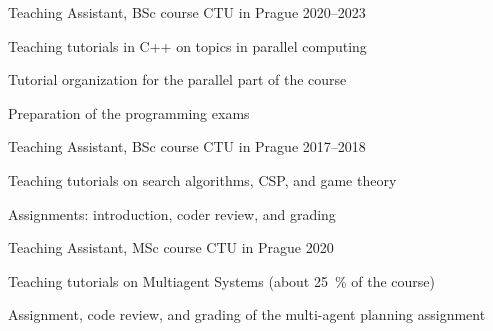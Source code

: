 

\begin{cventries}


  \cventry
    {Teaching Assistant, BSc course} %
    {} %
    {CTU in Prague} %
    {2020--2023} %
    {
      \begin{cvitems} %
        \item {Teaching tutorials in C++ on topics in parallel computing}
        \item {Tutorial organization for the parallel part of the course}
        \item {Preparation of the programming exams}
      \end{cvitems}
    }

  \cventry
  {Teaching Assistant, BSc course} %
  {} %
  {CTU in Prague} %
  {2017--2018} %
  {
    \begin{cvitems} %
      \item {Teaching tutorials on search algorithms, CSP, and game theory}
      \item {Assignments: introduction, coder review, and grading}
    \end{cvitems}
  }

  \cventry
  {Teaching Assistant, MSc course} %
  {} %
  {CTU in Prague} %
  {2020} %
  {
    \begin{cvitems} %
      \item{Teaching tutorials on Multiagent Systems (about \SI{25}{\percent} of the course)}
      \item {Assignment, code review, and grading of the multi-agent planning assignment}
    \end{cvitems}
  }

\end{cventries}
    

